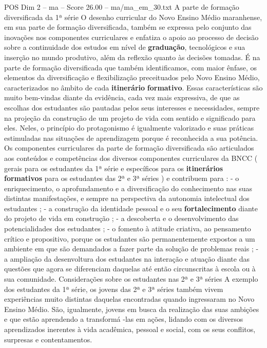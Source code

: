 \begin{textsample}{POS Dim 2 – ma – Score 26.00 – ma/ma\_em\_30.txt}  \label{ex:f2_pos_058}
A parte de formação diversificada da 1ª série O desenho curricular do Novo Ensino Médio maranhense, em sua parte de formação diversificada, também se expressa pelo conjunto das inovações nos componentes curriculares e enfatiza o apoio ao processo de decisão sobre a continuidade dos estudos em nível de \textbf{graduação}, tecnológicos e sua inserção no mundo produtivo, além da reflexão quanto às decisões tomadas.
É na parte de formação diversificada que também identificamos, com maior ênfase, os elementos da diversificação e flexibilização preceituados pelo Novo Ensino Médio, caracterizados no âmbito de cada \textbf{itinerário} \textbf{formativo}.
Essas características são muito bem-vindas diante da evidência, cada vez mais expressiva, de que as escolhas dos estudantes são pautadas pelos seus interesses e necessidades, sempre na projeção da construção de um projeto de vida com sentido e significado para eles.
Neles, o princípio do protagonismo é igualmente valorizado e suas práticas estimuladas nas situações de aprendizagem porque é reconhecida a sua potência.
Os componentes curriculares da parte de formação diversificada são articulados aos conteúdos e competências dos diversos componentes curriculares da BNCC ( gerais para os estudantes da 1ª série e específicos para os \textbf{itinerários} \textbf{formativos} para os estudantes das 2ª e 3ª séries ) e contribuem para : - o enriquecimento, o aprofundamento e a diversificação do conhecimento nas suas distintas manifestações, e sempre na perspectiva da autonomia intelectual dos estudantes ; - a construção da identidade pessoal e o seu \textbf{fortalecimento} diante do projeto de vida em construção ; - a descoberta e o desenvolvimento das potencialidades dos estudantes ; - o fomento à atitude criativa, ao pensamento crítico e propositivo, porque os estudantes são permanentemente expostos a um ambiente em que são demandados a fazer parte da solução de problemas reais ; - a ampliação da desenvoltura dos estudantes na interação e atuação diante das questões que agora se diferenciam daquelas até então circunscritas à escola ou à sua comunidade.
Considerações sobre os estudantes nas 2ª e 3ª séries A exemplo dos estudantes da 1ª série, os jovens das 2ª e 3ª séries também vivem experiências muito distintas daquelas encontradas quando ingressaram no Novo Ensino Médio.
São, igualmente, jovens em busca da realização das suas ambições e que estão aprendendo a transformá -las em ações, lidando com os diversos aprendizados inerentes à vida acadêmica, pessoal e social, com os seus conflitos, surpresas e contentamentos.

\end{textsample}
